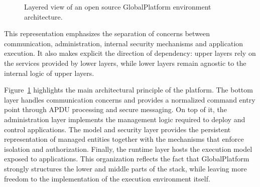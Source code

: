 \begin{figure}[ht]
  \centering
  \caption{Layered view of an open source GlobalPlatform environment architecture.}
  \label{fig:gp-layered-architecture}
\end{figure}

This representation emphasizes the separation of concerns between
communication, administration, internal security mechanisms and application
execution. It also makes explicit the direction of dependency: upper layers
rely on the services provided by lower layers, while lower layers remain
agnostic to the internal logic of upper layers.

Figure~\ref{fig:gp-layered-architecture} highlights the main architectural
principle of the platform. The bottom layer handles communication concerns and
provides a normalized command entry point through APDU processing and secure
messaging. On top of it, the administration layer implements the management
logic required to deploy and control applications. The model and security layer
provides the persistent representation of managed entities together with the
mechanisms that enforce isolation and authorization. Finally, the runtime layer
hosts the execution model exposed to applications. This organization reflects
the fact that GlobalPlatform strongly structures the lower and middle parts of
the stack, while leaving more freedom to the implementation of the execution
environment itself.


